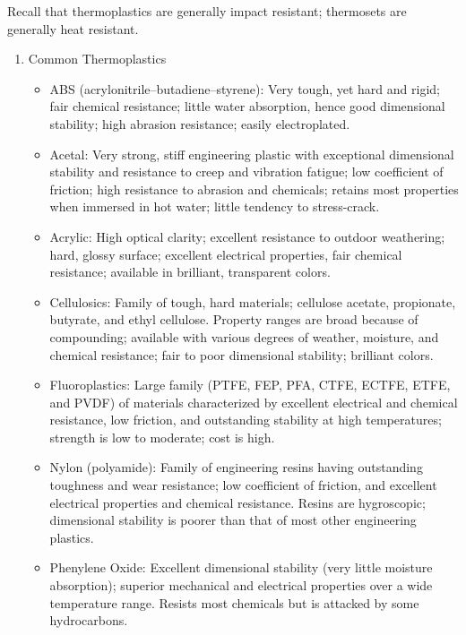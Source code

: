 \documentclass[a4paper,openany,12pt]{book}
\begin{document}
Recall that thermoplastics are generally impact resistant; thermosets
are generally heat resistant.

\begin{enumerate}
\item Common Thermoplastics
\label{sec:org5a5a030}
\begin{itemize}
\item ABS (acrylonitrile--butadiene--styrene): Very tough, yet hard and
rigid; fair chemical resistance; little water absorption, hence good
dimensional stability; high abrasion resistance; easily electroplated.

\item Acetal: Very strong, stiff engineering plastic with exceptional
dimensional stability and resistance to creep and vibration fatigue;
low coefficient of friction; high resistance to abrasion and
chemicals; retains most properties when immersed in hot water; little
tendency to stress-crack.

\item Acrylic: High optical clarity; excellent resistance to outdoor
weathering; hard, glossy surface; excellent electrical properties,
fair chemical resistance; available in brilliant, transparent colors.

\item Cellulosics: Family of tough, hard materials; cellulose acetate,
propionate, butyrate, and ethyl cellulose. Property ranges are broad
because of compounding; available with various degrees of weather,
moisture, and chemical resistance; fair to poor dimensional stability;
brilliant colors.

\item Fluoroplastics: Large family (PTFE, FEP, PFA, CTFE, ECTFE, ETFE, and
PVDF) of materials characterized by excellent electrical and chemical
resistance, low friction, and outstanding stability at high
temperatures; strength is low to moderate; cost is high.

\item Nylon (polyamide): Family of engineering resins having outstanding
toughness and wear resistance; low coefficient of friction, and
excellent electrical properties and chemical resistance. Resins are
hygroscopic; dimensional stability is poorer than that of most other
engineering plastics.

\item Phenylene Oxide: Excellent dimensional stability (very little moisture
absorption); superior mechanical and electrical properties over a wide
temperature range. Resists most chemicals but is attacked by some
hydrocarbons.


\end{itemize}
\end{enumerate}
\end{document}
